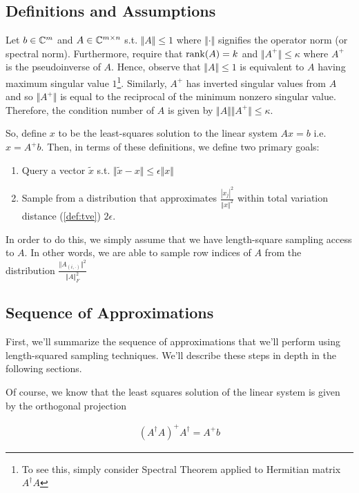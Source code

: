 \documentclass[main.tex]{subfiles}
\begin{document}
\subsection{Definitions and Assumptions}

Let $b \in \mathbb{C}^m$ and $A \in \mathbb{C}^{m \times n}$ s.t. $\Vert A \Vert \leq 1$ where $\Vert \cdot \Vert$ signifies the operator norm (or spectral norm). Furthermore, require that $\rank(A) = k$ and $\Vert A^+ \Vert \leq \kappa$ where $A^+$ is the pseudoinverse of $A$. Hence, observe that $\Vert A \Vert \leq 1$ is equivalent to $A$ having maximum singular value $1$\footnote{To see this, simply consider Spectral Theorem applied to Hermitian matrix $A^\dag A$}. Similarly, $A^+$ has inverted singular values from $A$ and so $\Vert A^+ \Vert$ is equal to the reciprocal of the minimum nonzero singular value. Therefore, the condition number of $A$ is given by $\Vert A \Vert \Vert A^+ \Vert \leq \kappa$.

So, define $x$ to be the least-squares solution to the linear system $Ax = b$ i.e. $x = A^+ b$. Then, in terms of these definitions, we define two primary goals:

\begin{enumerate}
\item Query a vector $\tilde{x}$ s.t. $\Vert \tilde{x} - x \Vert \leq \epsilon \Vert x \Vert$
\item Sample from a distribution that approximates $\frac{|x_j|^2}{\Vert x \Vert^2}$ within total variation distance (\autoref{def:tve}) $2\epsilon$.
\end{enumerate}

In order to do this, we simply assume that we have length-square sampling access to $A$. In other words, we are able to sample row indices of $A$ from the distribution $\frac{\Vert A_{(i, \cdot)}\Vert^2}{\Vert A \Vert^2_F}$

\subsection{Sequence of Approximations}

First, we'll summarize the sequence of approximations that we'll perform using length-squared sampling techniques. We'll describe these steps in depth in the following sections.

Of course, we know that the least squares solution of the linear system is given by the orthogonal projection

\begin{align*}
	(A^\dag A)^+ A^\dag = A^+ b
\end{align*}
\end{document}
